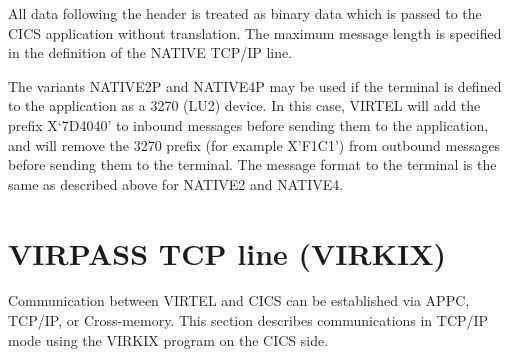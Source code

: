 \documentclass[letterpaper,10pt,english]{sphinxmanual}
\begin{document}

All data following the header is treated as binary data which is passed to the CICS application without translation. The maximum message length is specified in the definition of the NATIVE TCP/IP line.

The variants NATIVE2P and NATIVE4P may be used if the terminal is defined to the application as a 3270 (LU2) device. In this case, VIRTEL will add the prefix X‘7D4040’ to inbound messages before sending them to the application, and will remove the 3270 prefix (for example X’F1C1’) from outbound messages before sending them to the terminal. The message format to the terminal is the same as described above for NATIVE2 and NATIVE4.

\newpage

\ignorespaces 

\section{VIRPASS TCP line (VIRKIX)}
\label{\detokenize{connectivity_guide:virpass-tcp-line-virkix}}\label{\detokenize{connectivity_guide:index-42}}
Communication between VIRTEL and CICS can be established via APPC, TCP/IP, or Cross-memory. This section describes communications in TCP/IP mode using the VIRKIX program on the CICS side.


\ignorespaces 
\end{document}
